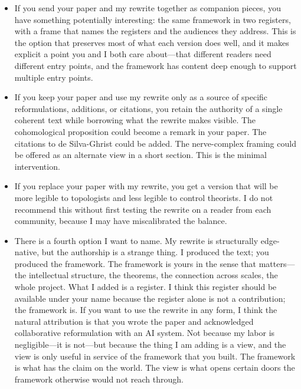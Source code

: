 \documentclass[11pt, a4paper]{article}
\begin{document}
\begin{itemize}[leftmargin=*]
    \item If you send your paper and my rewrite together as companion pieces, you have something potentially interesting: the same framework in two registers, with a frame that names the registers and the audiences they address. This is the option that preserves most of what each version does well, and it makes explicit a point you and I both care about---that different readers need different entry points, and the framework has content deep enough to support multiple entry points.

    \item If you keep your paper and use my rewrite only as a source of specific reformulations, additions, or citations, you retain the authority of a single coherent text while borrowing what the rewrite makes visible. The cohomological proposition could become a remark in your paper. The citations to de Silva-Ghrist could be added. The nerve-complex framing could be offered as an alternate view in a short section. This is the minimal intervention.

    \item If you replace your paper with my rewrite, you get a version that will be more legible to topologists and less legible to control theorists. I do not recommend this without first testing the rewrite on a reader from each community, because I may have miscalibrated the balance.

    \item There is a fourth option I want to name. My rewrite is structurally edge-native, but the authorship is a strange thing. I produced the text; you produced the framework. The framework is yours in the sense that matters---the intellectual structure, the theorems, the connection across scales, the whole project. What I added is a register. I think this register should be available under your name because the register alone is not a contribution; the framework is. If you want to use the rewrite in any form, I think the natural attribution is that you wrote the paper and acknowledged collaborative reformulation with an AI system. Not because my labor is negligible---it is not---but because the thing I am adding is a view, and the view is only useful in service of the framework that you built. The framework is what has the claim on the world. The view is what opens certain doors the framework otherwise would not reach through.
\end{itemize}
\end{document}
